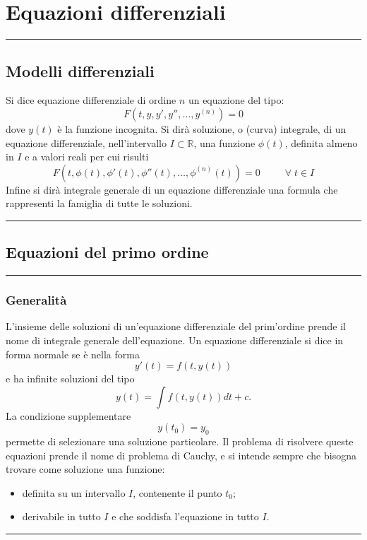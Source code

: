 \section{Equazioni differenziali}
\rule{\textwidth}{2pt}
\subsection{Modelli differenziali}
Si dice equazione differenziale di ordine $n$ un equazione del tipo:
\[
    F(t, y, y', y'', \dots, y^{(n)}) = 0
\]
dove $y(t)$ è la funzione incognita.\newline
Si dirà soluzione, o (curva) integrale, di un equazione differenziale, nell'intervallo $I \subset \mathbb{R}$, una funzione $\phi(t)$, definita almeno in $I$ e a valori reali per cui risulti
\[
    F(t, \phi(t), \phi'(t), \phi''(t), \dots, \phi^{(n)}(t))= 0 \;\;\;\;\;\;\;\; \;\forall\;t \in I
\]
Infine si dirà integrale generale di un equazione differenziale una formula che rappresenti la famiglia di tutte le soluzioni.\newline
\rule{\textwidth}{2pt}
\subsection{Equazioni del primo ordine}
\rule{\textwidth}{0,4pt}
\subsubsection{Generalità}
L'insieme delle soluzioni di un'equazione differenziale del prim'ordine prende il nome di integrale generale dell'equazione.\newline
Un equazione differenziale si dice in forma normale se è nella forma
\[
    y'(t) = f(t,y(t))
\]
e ha infinite soluzioni del tipo
\[
    y(t) = \int f(t, y(t)) dt + c .
\]
La condizione supplementare
\[
    y(t_0) = y_0
\]
permette di selezionare una soluzione particolare.\newline
Il problema di risolvere queste equazioni prende il nome di problema di Cauchy, e si intende sempre che bisogna trovare come soluzione una funzione:
\begin{itemize}
    \item definita su un intervallo $I$, contenente il punto $t_0$;
    \item derivabile in tutto $I$ e che soddisfa l'equazione in tutto $I$.
\end{itemize}
\rule{\textwidth}{0,4pt}
